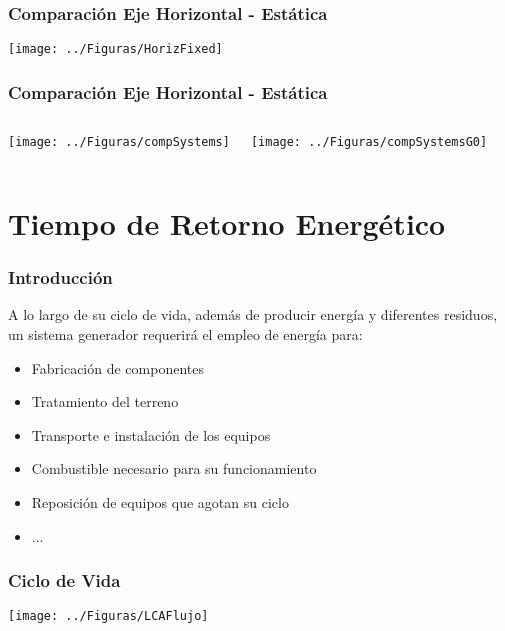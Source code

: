 \documentclass[xcolor=dvipsnames]{beamer}
\begin{document}
\begin{frame}[plain]
  \frametitle{Comparación Eje Horizontal - Estática}

    \texttt{[image: ../Figuras/HorizFixed]}

\end{frame}

\begin{frame}[plain]
  \frametitle{Comparación Eje Horizontal - Estática}
  \begin{columns}%


    \column{6cm}

    \texttt{[image: ../Figuras/compSystems]}

    \column{6cm}

    \texttt{[image: ../Figuras/compSystemsG0]}

  \end{columns}%
\end{frame}


\section{Tiempo de Retorno Energético}
\label{sec:epbt}

\begin{frame}
  \frametitle{Introducción}
  A lo largo de su ciclo de vida, además de producir energía y
  diferentes residuos, un sistema generador requerirá el empleo de
  energía para:
    \begin{itemize}
    \item Fabricación de componentes
    \item Tratamiento del terreno
    \item Transporte e instalación de los equipos
    \item Combustible necesario para su funcionamiento
    \item Reposición de equipos que agotan su ciclo
    \item ...
    \end{itemize}
\end{frame}

\begin{frame}
  \frametitle{Ciclo de Vida}

  \texttt{[image: ../Figuras/LCAFlujo]}
  
\end{frame}
\end{document}
